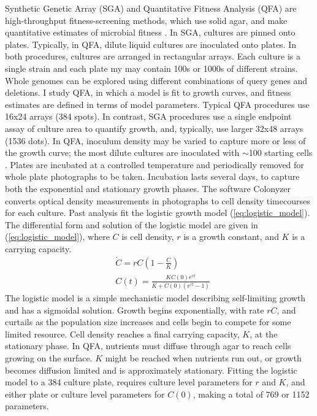 Synthetic Genetic Array (SGA) and Quantitative Fitness Analysis (QFA)
are high-throughput fitness-screening methods, which use solid agar,
and make quantitative estimates of microbial fitness
\citep{Baryshnikova2010sga,Banks2012}. In SGA, cultures are pinned
onto plates. Typically, in QFA, dilute liquid cultures are inoculated
onto plates. In both procedures, cultures are arranged in rectangular
arrays. Each culture is a single strain and each plate my may contain
100s or 1000s of different strains. Whole genomes can be explored
using different combinations of query genes and deletions. I study
QFA, in which a model is fit to growth curves, and fitness estimates
are defined in terms of model parameters. Typical QFA procedures use
16x24 arrays (384 spots). In contrast, SGA procedures use a single
endpoint assay of culture area to quantify growth, and, typically, use
larger 32x48 arrays (1536 dots). In QFA, inoculum density may be
varied to capture more or less of the growth curve; the most dilute
cultures are inoculated with \(\sim\)100 starting cells
\citep{Addinall2011}. Plates are incubated at a controlled temperature
and periodically removed for whole plate photographs to be
taken. Incubation lasts several days, to capture both the exponential
and stationary growth phases. The software Colonyzer
\citep{Lawless2010} converts optical density measurements in
photographs to cell density timecourses for each culture. Past
analysis fit the logistic growth model (\ref{eq:logistic_model}). The
differential form and solution of the logistic model
\citep{Verhulst1845} are given in (\ref{eq:logistic_model}), where
\(C\) is cell density, \(r\) is a growth constant, and \(K\) is a
carrying capacity.
\begin{subequations}
  \label{eq:logistic_model}
  \begin{align}
    &\dot{C} = rC\left(1 - \frac{C}{K}\right)\\
    &C(t) = \frac{KC(0)e^{rt}}{K + C(0)(e^{rt}-1)}
  \end{align}
\end{subequations}
%
The logistic model is a simple mechanistic model describing
self-limiting growth and has a sigmoidal solution. Growth begins
exponentially, with rate \(rC\), and curtails as the population size
increases and cells begin to compete for some limited resource. Cell
density reaches a final carrying capacity, \(K\), at the stationary
phase. In QFA, nutrients must diffuse through agar to reach cells
growing on the surface. \(K\) might be reached when nutrients run out,
or growth becomes diffusion limited and is approximately
stationary. Fitting the logistic model to a 384 culture plate,
requires culture level parameters for \(r\) and \(K\), and either
plate or culture level parameters for \(C(0)\), making a total of 769
or 1152 parameters.

